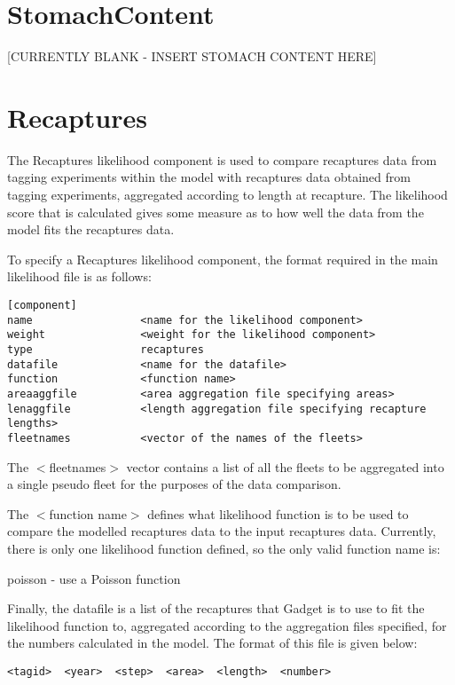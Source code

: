 \documentclass [a4paper, 10pt]{book}
\begin{document}
\section{StomachContent}\label{sec:stomach}
[CURRENTLY BLANK - INSERT STOMACH CONTENT HERE]

\section{Recaptures}\label{sec:recaptures}
The Recaptures likelihood component is used to compare recaptures data from tagging experiments within the model with recaptures data obtained from tagging experiments, aggregated according to length at recapture.  The likelihood score that is calculated gives some measure as to how well the data from the model fits the recaptures data.

\bigskip
To specify a Recaptures likelihood component, the format required in the main likelihood file is as follows:

{\small\begin{verbatim}
[component]
name                 <name for the likelihood component>
weight               <weight for the likelihood component>
type                 recaptures
datafile             <name for the datafile>
function             <function name>
areaaggfile          <area aggregation file specifying areas>
lenaggfile           <length aggregation file specifying recapture lengths>
fleetnames           <vector of the names of the fleets>
\end{verbatim}}

The $<$fleetnames$>$ vector contains a list of all the fleets to be aggregated into a single pseudo fleet for the purposes of the data comparison.

\bigskip
The $<$function name$>$ defines what likelihood function is to be used to compare the modelled recaptures data to the input recaptures data.  Currently, there is only one likelihood function defined, so the only valid function name is:

\bigskip
poisson - use a Poisson function

\bigskip
Finally, the datafile is a list of the recaptures that Gadget is to use to fit the likelihood function to, aggregated according to the aggregation files specified, for the numbers calculated in the model. The format of this file is given below:

{\small\begin{verbatim}
<tagid>  <year>  <step>  <area>  <length>  <number>
\end{verbatim}}
\end{document}

